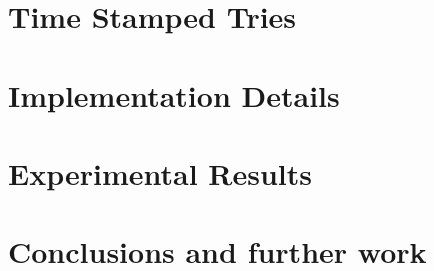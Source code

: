 \documentclass[12pt,a4paper]{report}
\begin{document}
\chapter{Time Stamped Tries}


\chapter{Implementation Details}

\chapter{Experimental Results}

\chapter{Conclusions and further work}

\appendix

  
\renewcommand{\bibname}{References}

{}
\end{document}
